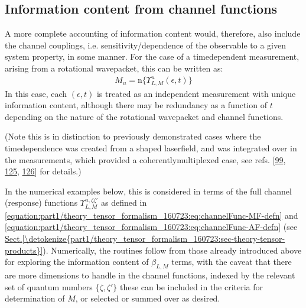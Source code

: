 \documentclass[letterpaper,table,10pt,english]{jupyterBook}
\begin{document}
\subsection{Information content from channel functions}
\label{\detokenize{part1/theory_info_content_200723:information-content-from-channel-functions}}
\sphinxAtStartPar
A more complete accounting of information content would, therefore, also
include the channel couplings, i.e. sensitivity/dependence of the
observable to a given system property, in some manner. For the case of a
time\sphinxhyphen{}dependent measurement, arising from a rotational wavepacket, this
can be written as:
\begin{equation*}
\begin{split}M_{u}=\mathrm{n}\{\varUpsilon_{L,M}^{u}(\epsilon,t)\}\end{split}
\end{equation*}
\sphinxAtStartPar
In this case, each \((\epsilon,t)\) is treated as an independent
measurement with unique information content, although there may be
redundancy as a function of \(t\) depending on the nature of the
rotational wavepacket and channel functions.

\sphinxAtStartPar
(Note this is in
distinction to previously demonstrated cases where the time\sphinxhyphen{}dependence
was created from a shaped laser\sphinxhyphen{}field, and was integrated over in the
measurements, which provided a coherently\sphinxhyphen{}multiplexed case, see refs.
{[}\hyperlink{cite.backmatter/bibliography:id663}{99}, \hyperlink{cite.backmatter/bibliography:id661}{125}, \hyperlink{cite.backmatter/bibliography:id662}{126}{]} for details.)

\sphinxAtStartPar
In the numerical examples below, this is considered in terms of the full channel (response) functions \(\varUpsilon_{L,M}^{u,\zeta\zeta'}\) as defined in \eqref{equation:part1/theory_tensor_formalism_160723:eq:channelFunc-MF-defn} and \eqref{equation:part1/theory_tensor_formalism_160723:eq:channelFunc-AF-defn} (see \hyperref[\detokenize{part1/theory_tensor_formalism_160723:sec-theory-tensor-products}]{Sect.\@ \ref{\detokenize{part1/theory_tensor_formalism_160723:sec-theory-tensor-products}}}). Numerically, the routines follow from those already introduced above for exploring the information content of \(\beta_{L,M}\) terms, with the caveat that there are more dimensions to handle in the channel functions, indexed by the relevant set of quantum numbers \(\{\zeta,\zeta'\}\) \sphinxhyphen{} these can be included in the criteria for determination of \(M\), or selected or summed over as desired.
\end{document}
